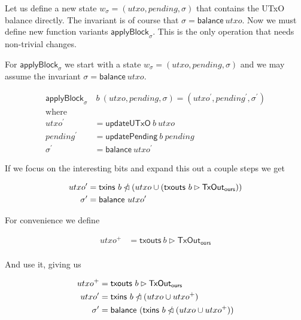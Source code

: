 \documentclass{article}
\newcommand{\restrictdom}{\lhd}
\newcommand{\subtractdom}{\mathbin{\slashed{\restrictdom}}}
\newcommand{\restrictrange}{\rhd}
\begin{document}
Let us define a new state $w_\sigma = (utxo, pending, \sigma)$ that contains the UTxO
balance directly. The invariant is of course that $\sigma = \mathsf{balance} ~ utxo$.
Now we must define new function variants $\mathsf{applyBlock}_\sigma$. This is
the only operation that needs non-trivial changes.

For $\mathsf{applyBlock}_\sigma$ we start with a state
$w_\sigma = (utxo, pending, \sigma)$
and we may assume the invariant $\sigma = \mathsf{balance} ~ utxo$.

\begin{equation*}
\begin{split}
\mathsf{applyBlock}_\sigma & ~ b ~ (utxo, pending, \sigma) = (utxo^\prime, pending^\prime, \sigma^\prime) \\
\text{where} \quad \\
    utxo^\prime & = \mathsf{updateUTxO} ~ b ~ utxo \\
    pending^\prime & = \mathsf{updatePending} ~ b ~ pending \\
    \sigma^\prime & = \mathsf{balance} ~ utxo^\prime
\end{split}
\end{equation*}

If we focus on the interesting bits and expand this out a couple steps we get

\begin{equation*}
\begin{split}
    utxo^\prime & = \mathsf{txins} ~ b \subtractdom (utxo \cup (\mathsf{txouts} ~ b \restrictrange \mathsf{TxOut_{ours}})) \\
    \sigma^\prime & = \mathsf{balance} ~ utxo^\prime
\end{split}
\end{equation*}

For convenience we define

\begin{equation*}
\begin{split}
    utxo^+ & = \mathsf{txouts} ~ b \restrictrange \mathsf{TxOut_{ours}} \\
\end{split}
\end{equation*}

And use it, giving us

\begin{equation*}
\begin{split}
    utxo^+ & = \mathsf{txouts} ~ b \restrictrange \mathsf{TxOut_{ours}} \\
    utxo^\prime & = \mathsf{txins} ~ b \subtractdom (utxo \cup utxo^+)  \\
    \sigma^\prime & = \mathsf{balance} ~ (\mathsf{txins} ~ b \subtractdom (utxo \cup utxo^+))
\end{split}
\end{equation*}
\end{document}
